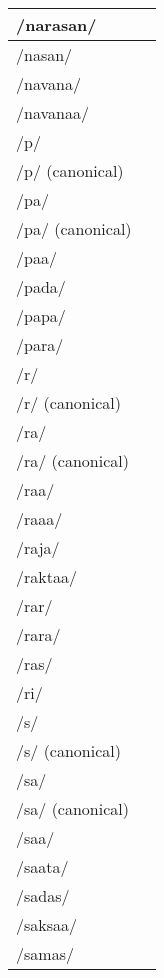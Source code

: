 \documentclass{article}
\begin{document}
\begin{longtable}{|l|p{}|}
/narasan/ & \textIndus{} \\ \hline
/nasan/ & \textIndus{} \\ \hline
/navana/ & \textIndus{} \\ \hline
/navanaa/ & \textIndus{} \\ \hline
/p/ & \textIndus{} \\ \hline
/p/ (canonical) & \textIndus{} \\ \hline
/pa/ & \textIndus{} \\ \hline
/pa/ (canonical) & \textIndus{} \\ \hline
/paa/ & \textIndus{} \\ \hline
/pada/ & \textIndus{} \\ \hline
/papa/ & \textIndus{} \\ \hline
/para/ & \textIndus{} \\ \hline
/r/ & \textIndus{} \\ \hline
/r/ (canonical) & \textIndus{} \\ \hline
/ra/ & \textIndus{} \\ \hline
/ra/ (canonical) & \textIndus{} \\ \hline
/raa/ & \textIndus{} \\ \hline
/raaa/ & \textIndus{} \\ \hline
/raja/ & \textIndus{} \\ \hline
/raktaa/ & \textIndus{} \\ \hline
/rar/ & \textIndus{} \\ \hline
/rara/ & \textIndus{} \\ \hline
/ras/ & \textIndus{} \\ \hline
/ri/ & \textIndus{} \\ \hline
/s/ & \textIndus{} \\ \hline
/s/ (canonical) & \textIndus{} \\ \hline
/sa/ & \textIndus{} \\ \hline
/sa/ (canonical) & \textIndus{} \\ \hline
/saa/ & \textIndus{} \\ \hline
/saata/ & \textIndus{} \\ \hline
/sadas/ & \textIndus{} \\ \hline
/saksaa/ & \textIndus{} \\ \hline
/samas/ & \textIndus{} \\ \hline

\end{longtable}
\end{document}
